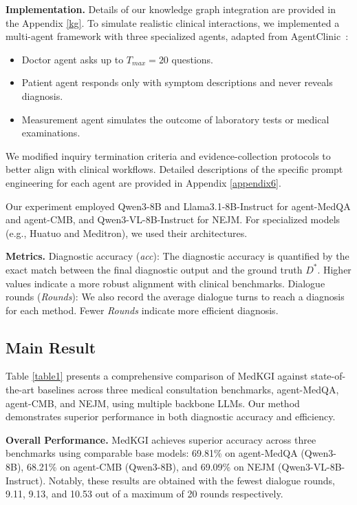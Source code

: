 \documentclass[11pt]{article}
\newcommand{\eg}{e.g.,\xspace}
\newcommand{\tool}{MedKGI{\xspace}}
\begin{document}
\textbf{Implementation.} 
Details of our knowledge graph integration are provided in the Appendix \ref{kg}.
To simulate realistic clinical interactions, we implemented a multi-agent framework with three specialized agents, adapted from AgentClinic~\cite{agentclinic2024samuel}: 

\begin{itemize}
	\item Doctor agent asks up to $T_{max} = 20$ questions.
	\item Patient agent responds only with symptom descriptions and never reveals diagnosis.
	\item Measurement agent simulates the outcome of laboratory tests or medical examinations.
\end{itemize}

We modified inquiry termination criteria and evidence-collection protocols to better align with clinical workflows. Detailed descriptions of the specific prompt engineering for each agent are provided in Appendix \ref{appendix6}.

Our experiment employed Qwen3-8B \cite{qwen32025} and Llama3.1-8B-Instruct \cite{Llama3} for agent-MedQA and agent-CMB, and Qwen3-VL-8B-Instruct \cite{qwen32025} for NEJM. For specialized models (\eg Huatuo and Meditron), we used their architectures.


\textbf{Metrics.} 
Diagnostic accuracy (\textit{acc}): The diagnostic accuracy is quantified by the exact match between the final diagnostic output and the ground truth $D^*$. Higher values indicate a more robust alignment with clinical benchmarks.
Dialogue rounds (\textit{Rounds}): We also record the average dialogue turns to reach a diagnosis for each method. Fewer \textit{Rounds} indicate more efficient diagnosis.



\subsection{Main Result}



Table \ref{table1} presents a comprehensive comparison of \tool{} against state-of-the-art baselines across three medical consultation benchmarks, agent-MedQA, agent-CMB, and NEJM, using multiple backbone LLMs. Our method demonstrates superior performance in both diagnostic accuracy and efficiency.

\textbf{Overall Performance.}
\tool{} achieves superior accuracy across three benchmarks using comparable base models: 69.81\% on agent-MedQA (Qwen3-8B), 68.21\% on agent-CMB (Qwen3-8B), and 69.09\% on NEJM (Qwen3-VL-8B-Instruct). Notably, these results are obtained with the fewest dialogue rounds, 9.11, 9.13, and 10.53 out of a maximum of 20 rounds respectively.
\end{document}
